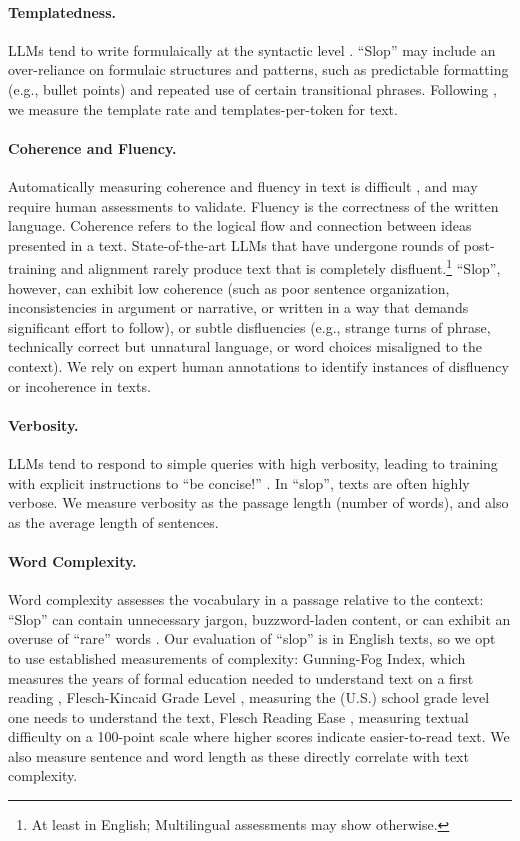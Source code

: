 \documentclass{article} %
\begin{document}
\paragraph{Templatedness.}
LLMs tend to write formulaically at the syntactic level \citep{shaib-etal-2024-detection}. 
``Slop'' may include an over-reliance on formulaic structures and patterns, such as predictable formatting (e.g., bullet points) and repeated use of certain transitional phrases. 
Following \citet{shaib-etal-2024-detection}, we measure the template rate and templates-per-token for text. 

\paragraph{Coherence and Fluency.}
Automatically measuring coherence and fluency in text is difficult \citep{Li2024LLMsasJudgesAC, Murugadoss2024EvaluatingTE}, and may require human assessments to validate. 
Fluency is the correctness of the written language.
Coherence refers to the logical flow and connection between ideas presented in a text.
State-of-the-art LLMs that have undergone rounds of post-training and alignment rarely produce text that is completely disfluent.\footnote{At least in English; Multilingual assessments may show otherwise.} 
``Slop'', however, can exhibit low coherence (such as poor sentence organization, inconsistencies in argument or narrative, or written in a way that demands significant effort to follow), or subtle disfluencies (e.g., strange turns of phrase, technically correct but unnatural language, or word choices misaligned to the context).
We rely on expert human annotations to identify instances of disfluency or incoherence in texts.

\paragraph{Verbosity.}
LLMs tend to respond to simple queries with high verbosity, leading to training with explicit instructions to ``be concise!'' \citep{Zhang2024VerbosityV}.
In ``slop'', texts are often highly verbose.
We measure verbosity as the passage length (number of words), and also as the average length of sentences. 

\paragraph{Word Complexity.}
Word complexity assesses the vocabulary in a passage relative to the context: ``Slop'' can contain unnecessary jargon, buzzword-laden content, or can exhibit an overuse of ``rare'' words \citep{hovy2016measuring}.
Our evaluation of ``slop'' is in English texts, so we opt to use established measurements of complexity: Gunning-Fog Index, which measures the years of formal education needed to understand text on a first reading \citep{Gunning1952-lq}, Flesch-Kincaid Grade Level \citep{kincaid1975derivation}, measuring the (U.S.) school grade level one needs to understand the text, Flesch Reading Ease \citep{flesch1948new}, measuring textual difficulty on a 100-point scale where higher scores indicate easier-to-read text. 
We also measure sentence and word length as these directly correlate with text complexity.
\end{document}
